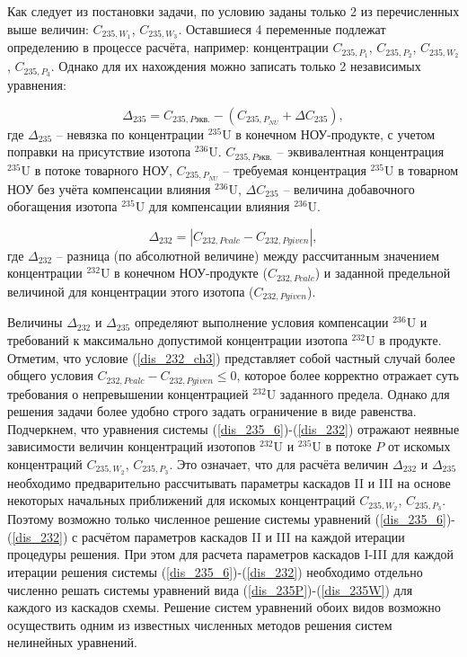 Как следует из постановки задачи, по условию заданы только 2 из перечисленных выше величин: $C_{235,{W_1}}$, $C_{235,{W_3}}$. Оставшиеся 4 переменные подлежат определению в процессе расчёта, например: концентрации $C_{235,{P_1}}$, $C_{235,{P_2}}$, $C_{235,{W_2}}$, $C_{235,{P_3}}$. Однако для их нахождения можно записать только 2 независимых уравнения:  

\begin{equation}
    \label{dis_235_6}
    \Delta_{235}=C_{235,P\textit{экв.}}-(C_{235,{P_{NU}}}+\Delta C_{235}),
\end{equation}
где $\Delta_{235}$ -- невязка по концентрации $^{235}$U в конечном НОУ-продукте, с учетом поправки на присутствие изотопа $^{236}$U. $C_{235,P\textit{экв.}}$ -- эквивалентная концентрация $^{235}$U в потоке товарного НОУ, $C_{235,{P_{NU}}}$ -- требуемая концентрация $^{235}$U в товарном НОУ без учёта компенсации влияния $^{236}$U, $\Delta C_{235}$ -- величина добавочного обогащения изотопа $^{235}$U для компенсации влияния $^{236}$U. 

\begin{equation}
\label{dis_232}
\Delta_{232}=\left|C_{232,P\textit{calc}}-C_{232,P\textit{given}}\right|,
\end{equation}
где $\Delta_{232}$ -- разница (по абсолютной величине) между рассчитанным значением концентрации $^{232}$U в конечном НОУ-продукте ($C_{232,P\textit{calc}}$) и заданной предельной величиной для концентрации этого изотопа ($C_{232,P\textit{given}}$).

Величины $\Delta_{232}$ и $\Delta_{235}$ определяют выполнение условия компенсации $^{236}$U и требований к максимально допустимой концентрации изотопа $^{232}$U в продукте. Отметим, что условие (\ref{dis_232_ch3}) представляет собой частный случай более общего условия $C_{232,P\textit{calc}}-C_{232,P\textit{given}}\leq 0$, которое более корректно отражает суть требования о непревышении концентрацией $^{232}$U заданного предела. Однако для решения задачи более удобно строго задать ограничение в виде равенства. Подчеркнем, что уравнения системы (\ref{dis_235_6})-(\ref{dis_232}) отражают неявные зависимости величин концентраций изотопов $^{232}$U и $^{235}$U в потоке $P$ от искомых концентраций $C_{235,{W_2}}$, $C_{235,{P_3}}$. Это означает, что для расчёта величин $\Delta_{232}$ и $\Delta_{235}$ необходимо предварительно рассчитывать параметры каскадов II и III на основе некоторых начальных приближений для искомых концентраций $C_{235,{W_2}}$, $C_{235,{P_3}}$. Поэтому возможно только численное решение системы уравнений (\ref{dis_235_6})-(\ref{dis_232}) с расчётом параметров каскадов II и III на каждой итерации процедуры решения. При этом для расчета параметров каскадов I-III для каждой итерации решения системы (\ref{dis_235_6})-(\ref{dis_232}) необходимо отдельно численно решать системы уравнений вида (\ref{dis_235P})-(\ref{dis_235W}) для каждого из каскадов схемы. Решение систем уравнений обоих видов возможно осуществить одним из известных численных методов решения систем нелинейных уравнений. 

